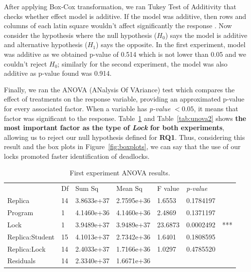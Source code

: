 After applying Box-Cox transformation, we ran Tukey Test of Additivity that checks whether effect model is additive. If the model was additive, then rows and columns of each latin square wouldn't affect significantly the response \cite{box}. Now consider the hypothesis where the null hypothesis ($H_{0}$) says the model is additive and alternative hypothesis ($H_{1}$) says the opposite. In the first experiment, model was additive as we obtained p-value of 0.514 which is not lower than 0.05 and we couldn't reject $H_{0}$; similarly for the second experiment, the model was also additive as p-value found was 0.914.

Finally, we ran the ANOVA (ANalysis Of VAriance) test which compares the effect of treatments on the response variable, providing an approximated p-value for every associated factor. When a variable has \emph{p-value} $< 0.05$, it means that factor was significant to the response. Table~\ref{tab:unova1} and Table~\ref{tab:unova2} shows \textbf{the most important factor as the type of \emph{Lock} for both experiments}, allowing us to reject our null hypothesis defined for {\bf RQ1}. Thus, considering this result and the box plots in Figure~\ref{fig:boxplots}, we can say that the use of our locks promoted faster identification of deadlocks.

\begin{table}%
\begin{center}
\caption{First experiment ANOVA results.}\label{tab:unova1}
\begin{tabular}{|l|l|l|l|l|ll|}
\hline
                & Df &    Sum Sq  &  Mean Sq   & F value & \emph{p-value} &     \\  
Replica         & 14 & 3.8633e+37 & 2.7595e+36 & 1.6553  & 0.1784197 &     \\   
Program         & 1  & 4.1460e+36 & 4.1460e+36 & 2.4869  & 0.1371197 &     \\   
Lock            & 1  & 3.9489e+37 & 3.9489e+37 & 23.6873 & 0.0002492 & *** \\
Replica:Student & 15 & 4.1013e+37 & 2.7342e+36 & 1.6401  & 0.1808595 &     \\  
Replica:Lock    & 14 & 2.4033e+37 & 1.7166e+36 & 1.0297  & 0.4785520 &     \\  
Residuals       & 14 & 2.3340e+37 & 1.6671e+36 &         &           &     \\
\hline
\end{tabular}
\end{center}
\end{table}

